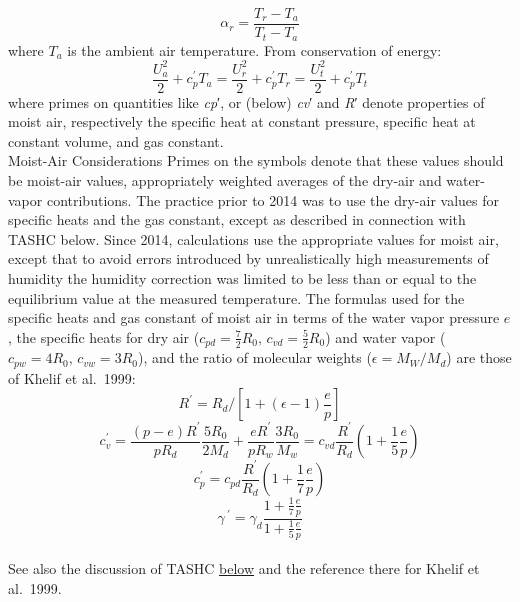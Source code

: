 \documentclass[
]{book}
\begin{document}
\begin{equation}
\alpha_{r}=\frac{T_{r}-T_{a}}{T_{t}-T_{a}}
\label{eq:alphar}
\end{equation}
where \(T_a\) is the ambient air temperature. From conservation of energy:\\
\begin{equation}
\frac{U_{a}^{2}}{2}+c_{p}^{\prime}T_{a}=\frac{U_{r}^{2}}{2}+c_{p}^{\prime}T_{r}=\frac{U_{t}^{2}}{2}+c_{p}^{\prime}T_{t}
\label{eq:Ua}
\end{equation}
where primes on quantities like {\emph{c}\emph{p}′}, or (below) {\emph{c}\emph{v}′} and {\emph{R}′} denote properties of moist air, respectively the specific heat at constant pressure, specific heat at constant volume, and gas constant.\\

Moist-Air Considerations
Primes on the symbols denote that these values should be moist-air
values, appropriately weighted averages of the dry-air and water-vapor
contributions. The practice prior to 2014 was to use the dry-air values
for specific heats and the gas constant, except as described in connection
with TASHC below. Since 2014, calculations use the appropriate values
for moist air, except that to avoid errors introduced by unrealistically
high measurements of humidity the humidity correction was limited
to be less than or equal to the equilibrium value at the measured
temperature. The formulas used for the specific heats and gas constant
of moist air in terms of the water vapor pressure \(e\), the specific
heats for dry air (\(c_{pd}=\frac{7}{2}R_{0},\,c_{vd}=\frac{5}{2}R_{0}\))
and water vapor (\(c_{pw}=4R_{0},\,c_{vw}=3R_{0}\)), and the ratio
of molecular weights (\(\epsilon=M_{W}/M_{d}\)) are those of Khelif
et al.~1999:\\
\begin{equation}
R^{\prime}=R_{d}/[1+(\epsilon-1)\frac{e}{p}]
\end{equation}
\begin{equation}
c_{v}^{\prime} = \frac{(p-e)R^{\prime}}{pR_{d}}\frac{5R_{0}}{2M_{d}}+\frac{eR^{\prime}}{pR_{w}}\frac{3R_{0}}{M_{w}}=c_{vd}\frac{R^{\prime}}{R_{d}}\left(1+\frac{1}{5}\frac{e}{p}\right)
\label{eq:cvMoist}
\end{equation}
\begin{equation}
c_{p}^{\prime} = c_{pd}\frac{R^{\prime}}{R_{d}}\left(1+\frac{1}{7}\frac{e}{p}\right)
\label{eq:cpMoist}
\end{equation}
\begin{equation}
\gamma\,^{\prime} = \gamma_{d}\frac{1+\frac{1}{7}\frac{e}{p}}{1+\frac{1}{5}\frac{e}{p}}
\label{eq:gammaMoist}
\end{equation}\\
See also the discussion of TASHC \protect\hyperlink{tashc}{below}
and the reference there for Khelif et al.~1999.
\end{document}
